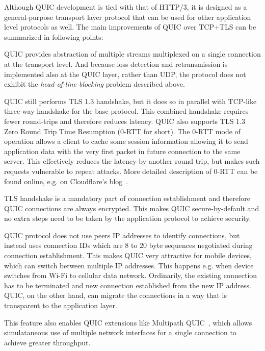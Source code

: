 Although QUIC development is tied with that of HTTP/3, it is designed as a general-purpose transport
layer protocol that can be used for other application level protocols as well. The main improvements
of QUIC over TCP+TLS can be summarized in following points:

\begin{itemize}
    QUIC provides abstraction of multiple streams multiplexed on a single connection at the
    transport level. And because loss detection and retransmission is implemented also at the QUIC
    layer, rather than UDP, the protocol does not exhibit the \textit{head-of-line blocking}
    problem described above.

   QUIC still performs TLS 1.3 handshake, but it does so in
    parallel with TCP-like three-way-handshake for the base protocol. This combined handshake
    requires fewer round-trips and therefore reduces latency. QUIC also supports TLS 1.3 Zero Round
    Trip Time Resumption (0-RTT for short). The 0-RTT mode of operation allows a client to cache
    some session information allowing it to send application data with the very first packet in
    future connection to the same server. This effectively reduces the latency by another round
    trip, but makes such requests vulnerable to repeat attacks. More detailed description of 0-RTT
    can be found online, e.g\@. on Cloudflare's blog~\cite{cloudflare-0rtt}.

   TLS handshake is a mandatory part of connection establishment and
    therefore QUIC connections are always encrypted. This makes QUIC secure-by-default and no extra
    steps need to be taken by the application protocol to achieve security.

   QUIC protocol does not use peers
    IP addresses to identify connections, but instead uses connection IDs which are 8 to 20 byte
    sequences negotiated during connection establishment. This makes QUIC very attractive for mobile
    devices, which can switch between multiple IP addresses. This happens e.g\@. when device
    switches from Wi-Fi to cellular data network. Ordinarily, the existing connection has to be
    terminated and new connection established from the new IP address. QUIC, on the other hand, can
    migrate the connections in a way that is transparent to the application layer.

    This feature also enables QUIC extensions like Multipath
    QUIC~\cite{draft-deconinck-quic-multipath-04}, which allows simulataneous use of multiple
    network interfaces for a single connection to achieve greater throughput.

\end{itemize}

